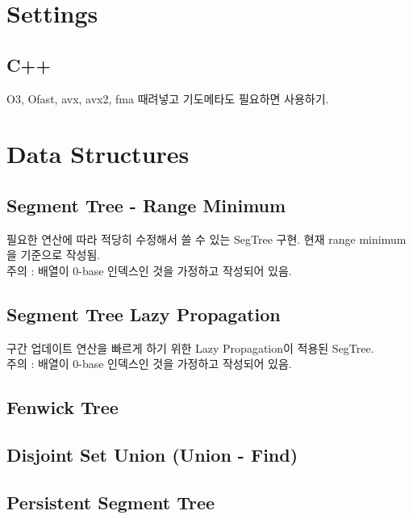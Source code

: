 \documentclass[landscape,8pt]{article}
\begin{document}
\newpage
\maketitle
\begin{multicols}{3}\raggedcolumns
\tableofcontents
\end{multicols}
\pagebreak
\begin{multicols}{2}\raggedcolumns
\section{Settings}
  \subsection{C++}
    O3, Ofast, avx, avx2, fma 때려넣고 기도메타도 필요하면 사용하기.
    
\section{Data Structures}
  \subsection{Segment Tree - Range Minimum}
     필요한 연산에 따라 적당히 수정해서 쓸 수 있는 SegTree 구현. 현재 range minimum을 기준으로 작성됨.\\
     주의 : 배열이 0-base 인덱스인 것을 가정하고 작성되어 있음.
     

  \subsection{Segment Tree Lazy Propagation}
     구간 업데이트 연산을 빠르게 하기 위한 Lazy Propagation이 적용된 SegTree.\\
     주의 : 배열이 0-base 인덱스인 것을 가정하고 작성되어 있음.
     
  \subsection{Fenwick Tree}
    
  \subsection{Disjoint Set Union (Union - Find)}
    
  \subsection{Persistent Segment Tree}
\columnbreak

\end{multicols}
\end{document}
